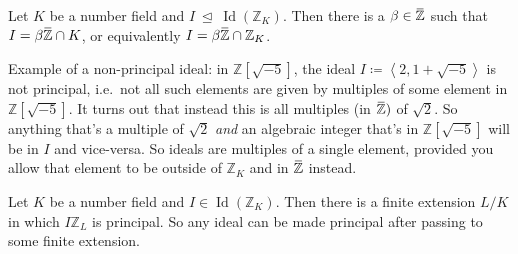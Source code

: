 \begin{theorem}

Let \(K\) be a number field and
\(I{~\trianglelefteq~}\operatorname{Id}({\mathbb{Z}}_K)\). Then there is
a
\(\beta\in \mkern 1.5mu\overline{\mkern-1.5mu{\mathbb{Z}}\mkern-1.5mu}\mkern 1.5mu\)
such that
\(I = \beta \mkern 1.5mu\overline{\mkern-1.5mu{\mathbb{Z}}\mkern-1.5mu}\mkern 1.5mu \cap K\),
or equivalently
\(I = \beta \mkern 1.5mu\overline{\mkern-1.5mu{\mathbb{Z}}\mkern-1.5mu}\mkern 1.5mu \cap{\mathbb{Z}}_K\).

\end{theorem}

\begin{remark}

Example of a non-principal ideal: in \({\mathbb{Z}}[\sqrt{-5}]\), the
ideal \(I \coloneqq\left\langle{ 2, 1 + \sqrt{-5} }\right\rangle\) is
not principal, i.e.~not all such elements are given by multiples of some
element in \({\mathbb{Z}}[ \sqrt{-5} ]\). It turns out that instead this
is all multiples (in
\(\mkern 1.5mu\overline{\mkern-1.5mu{\mathbb{Z}}\mkern-1.5mu}\mkern 1.5mu)\)
of \(\sqrt{2}\). So anything that's a multiple of \(\sqrt{2}\)
\emph{and} an algebraic integer that's in \({\mathbb{Z}}[\sqrt{-5}]\)
will be in \(I\) and vice-versa. So ideals are multiples of a single
element, provided you allow that element to be outside of
\({\mathbb{Z}}_K\) and in
\(\mkern 1.5mu\overline{\mkern-1.5mu{\mathbb{Z}}\mkern-1.5mu}\mkern 1.5mu\)
instead.

\end{remark}

\begin{lemma}

Let \(K\) be a number field and
\(I\in \operatorname{Id}({\mathbb{Z}}_K)\). Then there is a finite
extension \(L/K\) in which \(I{\mathbb{Z}}_L\) is principal. So any
ideal can be made principal after passing to some finite extension.

\end{lemma}

